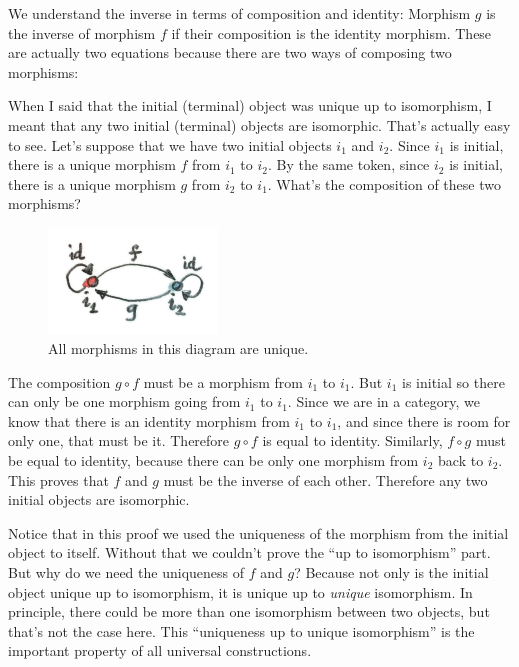 We understand the inverse in terms of composition and identity: Morphism
$g$ is the inverse of morphism $f$ if their composition is the
identity morphism. These are actually two equations because there are
two ways of composing two morphisms:

When I said that the initial (terminal) object was unique up to
isomorphism, I meant that any two initial (terminal) objects are
isomorphic. That's actually easy to see. Let's suppose that we have two
initial objects $i_{1}$ and $i_{2}$. Since
$i_{1}$ is initial, there is a unique morphism $f$ from
$i_{1}$ to $i_{2}$. By the same token, since
$i_{2}$ is initial, there is a unique morphism $g$ from
$i_{2}$ to $i_{1}$. What's the composition of
these two morphisms?

\begin{figure}[H]
  \centering
  \includegraphics[width=0.4\textwidth]{images/uniqueness.jpg}
  \caption{All morphisms in this diagram are unique.}
\end{figure}

\noindent
The composition $g \circ f$ must be a morphism from $i_{1}$ to
$i_{1}$. But $i_{1}$ is initial so there can only
be one morphism going from $i_{1}$ to $i_{1}$.
Since we are in a category, we know that there is an identity morphism
from $i_{1}$ to $i_{1}$, and since there is room
for only one, that must be it. Therefore $g \circ f$ is equal to
identity. Similarly, $f \circ g$ must be equal to identity, because there
can be only one morphism from $i_{2}$ back to
$i_{2}$. This proves that $f$ and $g$ must be the
inverse of each other. Therefore any two initial objects are isomorphic.

Notice that in this proof we used the uniqueness of the morphism from
the initial object to itself. Without that we couldn't prove the ``up to
isomorphism'' part. But why do we need the uniqueness of $f$ and
$g$? Because not only is the initial object unique up to
isomorphism, it is unique up to \emph{unique} isomorphism. In principle,
there could be more than one isomorphism between two objects, but that's
not the case here. This ``uniqueness up to unique isomorphism'' is the
important property of all universal constructions.

